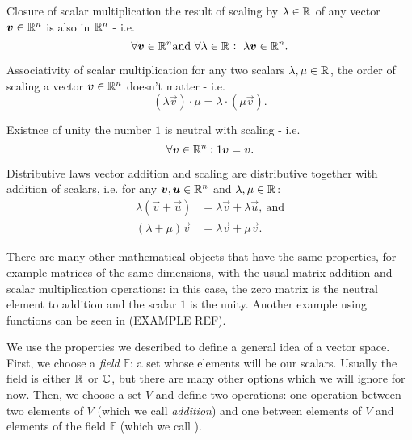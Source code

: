 \begin{descitemize}
    \item[Closure of scalar multiplication] the result of scaling by $\lambda\in\Rs$ of any vector $\vec{v}\in\Rs[n]$ is also in $\Rs[n]$ - i.e. 
    \begin{equation}
        \forall\vec{v}\in\Rs[n] \text{and}\ \forall\lambda\in\Rs:\ \lambda\vec{v}\in\Rs[n].
        \label{eq:scalar_multiplication_closure}
    \end{equation}

    \item[Associativity of scalar multiplication] for any two scalars $\lambda,\mu\in\Rs$, the order of scaling a vector $\vec{v}\in\Rs[n]$ doesn't matter - i.e.
    \begin{equation}
        \left(\lambda\vec{v}\right)\cdot\mu = \lambda\cdot\left(\mu\vec{v}\right).
        \label{eq:scalar_multiplication_associative}
    \end{equation}

    \item[Existnce of unity] the number $1$ is neutral with scaling - i.e.
        \begin{equation}
            \forall \vec{v}\in\Rs[n]: 1\vec{v}=\vec{v}.
            \label{eq:scalar_multiplication_unity}
        \end{equation}

    \item[Distributive laws] vector addition and scaling are distributive together with addition of scalars, i.e. for any $\vec{v},\vec{u}\in\Rs[n]$ and $\lambda,\mu\in\Rs$:
        \begin{align}
            \lambda\left(\vec{v}+\vec{u}\right) &= \lambda\vec{v} + \lambda\vec{u},\ \text{and}\\ \left(\lambda+\mu\right)\vec{v} &= \lambda\vec{v} + \mu\vec{v}.
            \label{eq:label}
        \end{align}
\end{descitemize}

There are many other mathematical objects that have the same properties, for example matrices of the same dimensions, with the usual matrix addition and scalar multiplication operations: in this case, the zero matrix is the neutral element to addition and the scalar $1$ is the unity. Another example using functions can be seen in (EXAMPLE REF).

We use the properties we described to define a general idea of a vector space. First, we choose a \textit{field} $\mathbb{F}$: a set whose elements will be our scalars. Usually the field is either $\Rs$ or $\Cs$, but there are many other options which we will ignore for now. Then, we choose a set $V$ and define two operations: one operation between two elements of $V$ (which we call \textit{addition}) and one between elements of $V$ and elements of the field $\mathbb{F}$ (which we call ).

